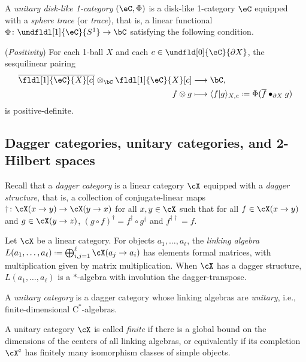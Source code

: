 \documentclass[12pt,reqno]{amsart}
\newcommand{\psn}{\Phi}
\newcommand{\C}{\eC}
\newcommand{\blt}{\bullet}
\newcommand{\fcj}[1]{\overline{#1}}
\newcommand{\orev}{\overline}
\newcommand{\bkt}[2]{\langle #1|#2 \rangle}
\newcommand{\Cstar}{\ensuremath{\mathrm{C}^{*}}}
\newcommand{\defn}[1]{\emph{#1}}
\newcommand{\cent}{\textup{\textcent}}
\DeclareRobustCommand{\coloneq}{\mathrel{\vcenter{\baselineskip0.5ex\lineskiplimit0pt\hbox{\scriptsize{\upshape.}}\hbox{\scriptsize{\upshape.}}}}=}
\begin{document}
\begin{definition}
\label{def:unitary disk-like 1-category}
A \defn{unitary disk-like 1-category} $(\C,\psn)$ is a disk-like 1-category $\C$ equipped with a \defn{sphere trace} (or \defn{trace}), that is, a linear functional $\psn\colon\undfldl[1]{\C}{S^1}\to\bC$ satisfying the following condition.
\begin{lst}[font=\upshape]
\item[($\psn$P)]\label{1psnP}
(\emph{Positivity})
For each 1-ball $X$ and each $c\in \undfld[0]{\C}{\partial X}$, the sesquilinear pairing
\begin{equation}
\begin{aligned}
\orev{\fldl[1]{\C}{X}[c]}\otimes_{\bC}\fldl[1]{\C}{X}[c] & \longrightarrow \bC,
\\
f\otimes g                      & \longmapsto \bkt{f}{g}_{X,c}\coloneq\psn(\fcj f\blt_{\partial X} g)
\end{aligned}
\end{equation}
is positive-definite.
\end{lst}
\end{definition}

\subsection{Dagger categories, unitary categories, and 2-Hilbert spaces}
Recall that a \defn{dagger category} is a linear category $\cX$ equipped with a \defn{dagger structure}, that is, a collection of conjugate-linear maps $\dag\colon\cX(x\to y)\to \cX(y\to x)$ for all $x,y\in\cX$ such that for all $f\in\cX(x\to y)$ and $g\in \cX(y\to z)$, $(g\circ f)^\dag=f^\dag\circ g^\dag$ and $f^{\dag\dag}=f$. 

Let $\cX$ be a linear category. For objects $a_1,\dots,a_\ell$, the \defn{linking algebra} $L(a_1,\dots,a_\ell)\coloneq\bigoplus_{i,j=1}^\ell\cX(a_j \to a_i)$ has elements formal matrices, with multiplication given by matrix multiplication. When $\cX$ has a dagger structure, $L(a_1,\dots,a_\ell)$ is a $*$-algebra with involution the dagger-transpose.

\begin{definition}
\label{def:unitarycategory}
A \defn{unitary category} is a dagger category whose linking algebras are \defn{unitary}, i.e., finite-dimensional $\Cstar$-algebras.
\end{definition}

\begin{definition}
\label{def:finiteunitarycategory}
A unitary category $\cX$ is called \defn{finite} if there is a global bound on the dimensions of the centers of all linking algebras, or equivalently if its completion $\cX^\cent$ has finitely many isomorphism classes of simple objects.
\end{definition}
\end{document}
